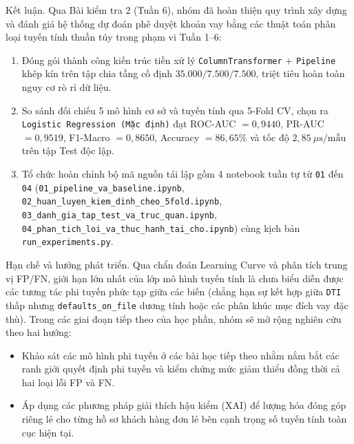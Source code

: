 \documentclass[12pt,a4paper,oneside]{report}
\begin{document}
Kết luận. Qua Bài kiểm tra 2 (Tuần 6), nhóm đã hoàn thiện quy trình xây dựng và đánh giá hệ thống dự đoán phê duyệt khoản vay bằng các thuật toán phân loại tuyến tính thuần túy trong phạm vi Tuần 1--6:
\begin{enumerate}
  \item Đóng gói thành công kiến trúc tiền xử lý \texttt{ColumnTransformer} + \texttt{Pipeline} khép kín trên tập chia tầng cố định $35.000 / 7.500 / 7.500$, triệt tiêu hoàn toàn nguy cơ rò rỉ dữ liệu.
  \item So sánh đối chiếu 5 mô hình cơ sở và tuyến tính qua 5-Fold CV, chọn ra \texttt{Logistic Regression (Mặc định)} đạt ROC-AUC $= 0{,}9440$, PR-AUC $= 0{,}9519$, F1-Macro $= 0{,}8650$, Accuracy $= 86{,}65\%$ và tốc độ $2{,}85\ \mu\text{s/mẫu}$ trên tập Test độc lập.
  \item Tổ chức hoàn chỉnh bộ mã nguồn tái lập gồm 4 notebook tuần tự từ \texttt{01} đến \texttt{04} (\texttt{01\_pipeline\_va\_baseline.ipynb}, \allowbreak\texttt{02\_huan\_luyen\_kiem\_dinh\_cheo\_5fold.ipynb}, \allowbreak\texttt{03\_danh\_gia\_tap\_test\_va\_truc\_quan.ipynb}, \allowbreak\texttt{04\_phan\_tich\_loi\_va\_thuc\_hanh\_tai\_cho.ipynb}) cùng kịch bản \texttt{run\_experiments.py}.
\end{enumerate}

Hạn chế và hướng phát triển. Qua chẩn đoán Learning Curve và phân tích trung vị FP/FN, giới hạn lớn nhất của lớp mô hình tuyến tính là chưa biểu diễn được các tương tác phi tuyến phức tạp giữa các biến (chẳng hạn sự kết hợp giữa \texttt{DTI} thấp nhưng \texttt{defaults\_on\_file} dương tính hoặc các phân khúc mục đích vay đặc thù). Trong các giai đoạn tiếp theo của học phần, nhóm sẽ mở rộng nghiên cứu theo hai hướng:
\begin{itemize}
  \item Khảo sát các mô hình phi tuyến ở các bài học tiếp theo nhằm nắm bắt các ranh giới quyết định phi tuyến và kiểm chứng mức giảm thiểu đồng thời cả hai loại lỗi FP và FN.
  \item Áp dụng các phương pháp giải thích hậu kiểm (XAI) để lượng hóa đóng góp riêng lẻ cho từng hồ sơ khách hàng đơn lẻ bên cạnh trọng số tuyến tính toàn cục hiện tại.
\end{itemize}
\end{document}
